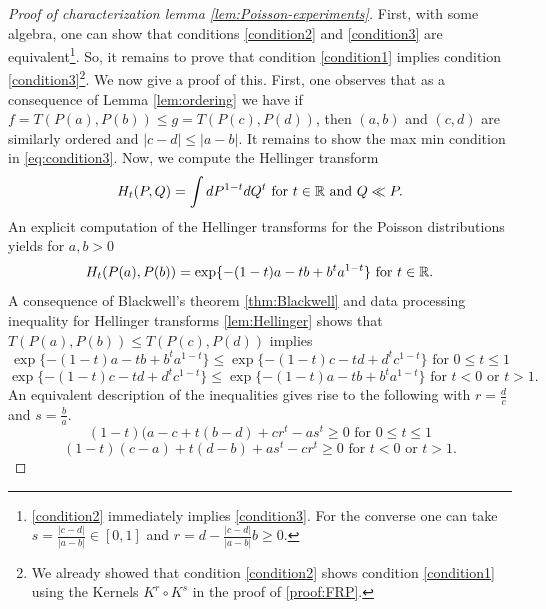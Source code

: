 \begin{proof}[Proof of characterization lemma \ref{lem:Poisson-experiments}]
    First, with some algebra, one can show that conditions \ref{condition2} and \ref{condition3} are equivalent\footnote{\ref{condition2} immediately implies \ref{condition3}. For the converse one can take $s= \frac{|c-d|}{|a-b|} \in [0,1]$ and $r= d- \frac{|c-d|}{|a-b|} b \geq 0$.}. So, it remains to prove that condition \ref{condition1} implies condition \ref{condition3}\footnote{We already showed that condition \ref{condition2} shows condition \ref{condition1} using the Kernels $K^r\circ K^s$ in the proof of \ref{proof:FRP}.}. We now give a proof of this.  First, one observes that as a consequence of Lemma \ref{lem:ordering} we have  if $f=T(P(a),P(b))\leq g=T(P(c), P(d))$, then $(a,b)$ and $(c,d)$ are similarly ordered and $|c-d|\leq |a-b|$. It remains to show the max min condition in \ref{eq:condition3}.
    Now, we compute the Hellinger transform 
    \begin{equation}
    H_t(P,Q)= \int dP^{1-t} dQ^t \text{ for } t \in \mathbb{R} \text{ and } Q \ll P.
    \end{equation}
    An explicit computation of the Hellinger transforms for the Poisson distributions yields for $a,b>0$
    \begin{equation}
        H_t(P(a), P(b)) = \exp \{ -(1-t)a -tb +b^ta^{1-t}\} \text{ for } t\in \mathbb{R}. 
    \end{equation}
    A consequence of Blackwell's theorem \ref{thm:Blackwell} and data processing inequality for Hellinger transforms \ref{lem:Hellinger} shows that $T(P(a), P(b)) \leq T(P(c), P(d))$ implies 
    \begin{equation}
        \exp \{ -(1-t)a -tb +b^ta^{1-t}\} \leq \exp \{ -(1-t)c -td +d^tc^{1-t}\} \text{ for } 0\leq t\leq 1
    \end{equation}
    \begin{equation}
        \exp \{ -(1-t)c -td +d^tc^{1-t}\} \leq \exp \{ -(1-t)a -tb +b^ta^{1-t}\} \text{ for } t < 0 \text{ or } t > 1.
    \end{equation}
    An equivalent description of the inequalities gives rise to the following with $r= \frac{d}{c}$ and $s= \frac{b}{a}$.
    \begin{equation}
      (1-t)(a-c +t(b-d) + c r^t  - a s^t \geq    0 \text{ for } 0\leq t\leq 1
    \end{equation}
    \begin{equation} \label{eq:ttoinfty}
         (1-t)(c-a) +t(d-b) + a s^t - c r^t \geq 0  \text{ for } t < 0 \text{ or } t > 1.
    \end{equation}


\end{proof}
